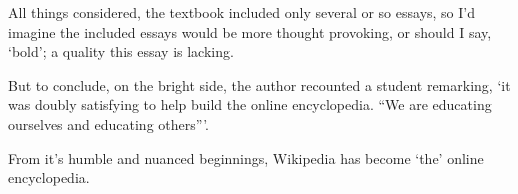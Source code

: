 All things considered, the textbook included only several or so essays, so I’d imagine the included essays would be more thought provoking, or should I say, `bold'; a quality this essay is lacking.

But to conclude, on the bright side, the author recounted a student remarking, `it was doubly satisfying to help build the online encyclopedia. ``We are educating ourselves and educating others'''.

From it’s humble and nuanced beginnings, Wikipedia has become `the' online encyclopedia.






